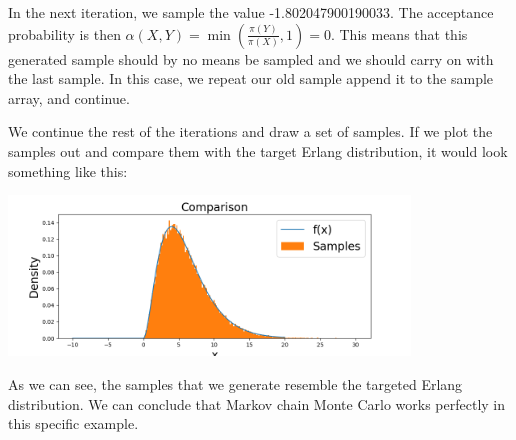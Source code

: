 In the next iteration, we sample the value -1.802047900190033. The acceptance probability is then $\alpha(X, Y) = \min (\frac{\pi(Y)}{\pi(X)}, 1) = 0$. This means that this generated sample should by no means be sampled and we should carry on with the last sample. In this case, we repeat our old sample append it to the sample array, and continue.

We continue the rest of the iterations and draw a set of samples. If we plot the samples out and compare them with the target Erlang distribution, it would look something like this:

\begin{center}
\includegraphics[width=0.8\textwidth]{figures/mcmc_example/result.png}
\end{center}

As we can see, the samples that we generate resemble the targeted Erlang distribution. We can conclude that Markov chain Monte Carlo works perfectly in this specific example.